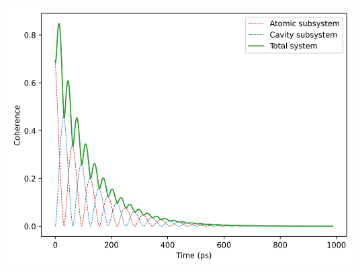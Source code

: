 \documentclass[11pt]{article}
\begin{document}
\begin{figure}[H]
    \begin{subfigure}{0.45\textwidth}
        \centering
        \includegraphics[width=0.85\linewidth]{Research Project/Code/results/JCM/OQS_Coh_Both_eg.png}
        \caption{}
        \label{fig:JCM_OQS_Coh_Both_eg}
    \end{subfigure}
    \hfill
    \caption{}
    \label{fig:JCM_OQS_Coh_eg}
\end{figure}
\end{document}
